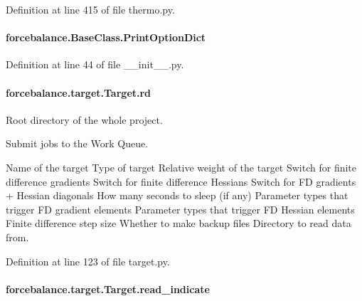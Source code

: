 Definition at line 415 of file thermo.\-py.

\hypertarget{classforcebalance_1_1BaseClass_afc6659278497d7245bc492ecf405ccae}{
\paragraph[{Print\-Option\-Dict}]{\setlength{\rightskip}{0pt plus 5cm}forcebalance.\-Base\-Class.\-Print\-Option\-Dict\hspace{0.3cm}{\ttfamily [inherited]}}}\label{classforcebalance_1_1BaseClass_afc6659278497d7245bc492ecf405ccae}


Definition at line 44 of file \-\_\-\-\_\-init\-\_\-\-\_\-.\-py.

\hypertarget{classforcebalance_1_1target_1_1Target_a4edb69fbde792e9f2f27e54b7c978c8e}{
\paragraph[{rd}]{\setlength{\rightskip}{0pt plus 5cm}forcebalance.\-target.\-Target.\-rd\hspace{0.3cm}{\ttfamily [inherited]}}}\label{classforcebalance_1_1target_1_1Target_a4edb69fbde792e9f2f27e54b7c978c8e}


Root directory of the whole project. 

Submit jobs to the Work Queue.

Name of the target Type of target Relative weight of the target Switch for finite difference gradients Switch for finite difference Hessians Switch for F\-D gradients + Hessian diagonals How many seconds to sleep (if any) Parameter types that trigger F\-D gradient elements Parameter types that trigger F\-D Hessian elements Finite difference step size Whether to make backup files Directory to read data from.

Definition at line 123 of file target.\-py.

\hypertarget{classforcebalance_1_1target_1_1Target_aa8af57d5be669c4bb1c0cfd4b7a9220e}{
\paragraph[{read\-\_\-indicate}]{\setlength{\rightskip}{0pt plus 5cm}forcebalance.\-target.\-Target.\-read\-\_\-indicate\hspace{0.3cm}{\ttfamily [inherited]}}}\label{classforcebalance_1_1target_1_1Target_aa8af57d5be669c4bb1c0cfd4b7a9220e}


